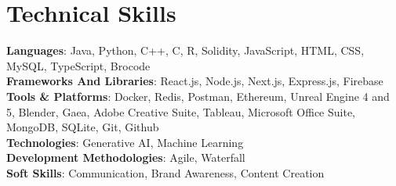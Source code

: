 \documentclass[a4paper,11pt]{article}
\begin{document}
\section{Technical Skills}
\begin{itemize}[leftmargin=0.15in, label={}]
    \small{
        \item{
        \textbf{Languages}{:  Java, Python, C++, C, R, Solidity, JavaScript, HTML, CSS, MySQL, TypeScript, Brocode}\\
            \textbf{Frameworks And Libraries}{: React.js, Node.js, Next.js, Express.js, Firebase} \\
            \textbf{Tools \& Platforms}{: Docker, Redis, Postman, Ethereum, Unreal Engine 4 and 5, Blender, Gaea, Adobe Creative Suite, Tableau, Microsoft Office Suite, MongoDB, SQLite, Git, Github} \\
            \textbf{Technologies}{: Generative AI, Machine Learning} \\
            \textbf{Development Methodologies}{: Agile, Waterfall} \\
            \textbf{Soft Skills}{: Communication, Brand Awareness, Content Creation} \\
        }
    }
\end{itemize}
\vspace{-13pt}
\end{document}
